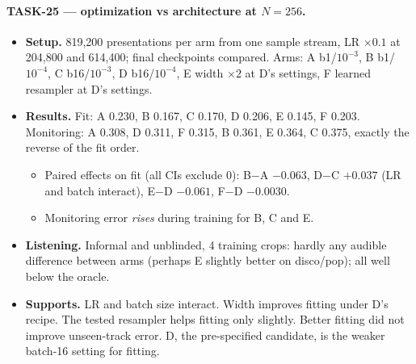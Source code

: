 \documentclass[10pt,letterpaper]{article}
\begin{document}
\paragraph{TASK-25 --- optimization vs architecture at $N{=}256$.}
\begin{itemize}
\item \textbf{Setup.} 819{,}200 presentations per arm from one sample stream, LR $\times0.1$ at 204{,}800 and 614{,}400; final checkpoints compared. Arms: A b1/$10^{-3}$, B b1/$10^{-4}$, C b16/$10^{-3}$, D b16/$10^{-4}$, E width $\times2$ at D's settings, F learned resampler at D's settings.
\item \textbf{Results.} Fit: A 0.230, B 0.167, C 0.170, D 0.206, E 0.145, F 0.203. Monitoring: A 0.308, D 0.311, F 0.315, B 0.361, E 0.364, C 0.375, exactly the reverse of the fit order.
  \begin{itemize}
  \item Paired effects on fit (all CIs exclude 0): B$-$A $-0.063$, D$-$C $+0.037$ (LR and batch interact), E$-$D $-0.061$, F$-$D $-0.0030$.
  \item Monitoring error \emph{rises} during training for B, C and E.
  \end{itemize}
\item \textbf{Listening.} Informal and unblinded, 4 training crops: hardly any audible difference between arms (perhaps E slightly better on disco/pop); all well below the oracle.
\item \textbf{Supports.} LR and batch size interact. Width improves fitting under D's recipe. The tested resampler helps fitting only slightly. Better fitting did not improve unseen-track error. D, the pre-specified candidate, is the weaker batch-16 setting for fitting.
\end{itemize}
\end{document}

